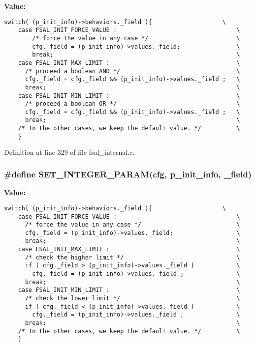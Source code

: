 \textbf{Value:}

\begin{Code}\begin{verbatim}switch( (p_init_info)->behaviors._field ){                    \
    case FSAL_INIT_FORCE_VALUE :                                  \
        /* force the value in any case */                         \
        cfg._field = (p_init_info)->values._field;                \
        break;                                                    \
    case FSAL_INIT_MAX_LIMIT :                                    \
      /* proceed a boolean AND */                                 \
      cfg._field = cfg._field && (p_init_info)->values._field ;   \
      break;                                                      \
    case FSAL_INIT_MIN_LIMIT :                                    \
      /* proceed a boolean OR */                                  \
      cfg._field = cfg._field && (p_init_info)->values._field ;   \
      break;                                                      \
    /* In the other cases, we keep the default value. */          \
    }
\end{verbatim}
\end{Code}


Definition at line 329 of file fsal\_\-internal.c.
\subsubsection[{SET\_\-INTEGER\_\-PARAM}]{\setlength{\rightskip}{0pt plus 5cm}\#define SET\_\-INTEGER\_\-PARAM(cfg, \/  p\_\-init\_\-info, \/  \_\-field)}\label{fsal__internal_8c_1338c45d33ed60654787c72596f36adc}


\textbf{Value:}

\begin{Code}\begin{verbatim}switch( (p_init_info)->behaviors._field ){                    \
    case FSAL_INIT_FORCE_VALUE :                                  \
      /* force the value in any case */                           \
      cfg._field = (p_init_info)->values._field;                  \
      break;                                                      \
    case FSAL_INIT_MAX_LIMIT :                                    \
      /* check the higher limit */                                \
      if ( cfg._field > (p_init_info)->values._field )            \
        cfg._field = (p_init_info)->values._field ;               \
      break;                                                      \
    case FSAL_INIT_MIN_LIMIT :                                    \
      /* check the lower limit */                                 \
      if ( cfg._field < (p_init_info)->values._field )            \
        cfg._field = (p_init_info)->values._field ;               \
      break;                                                      \
    /* In the other cases, we keep the default value. */          \
    }
\end{verbatim}
\end{Code}


